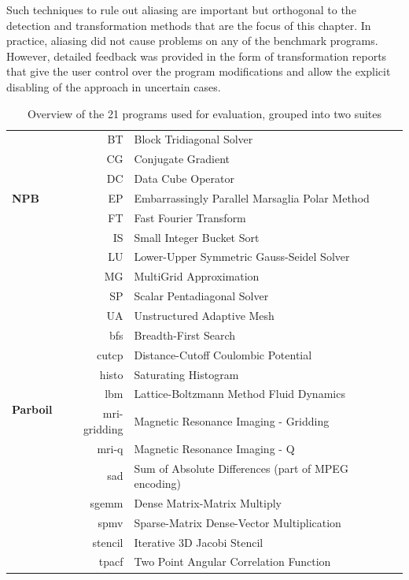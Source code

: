     Such techniques to rule out aliasing are important but orthogonal to the
    detection and transformation methods that are the focus of this chapter.
    In practice, aliasing did not cause problems on any of the benchmark
    programs.
    However, detailed feedback was provided in the form of transformation
    reports that give the user control over the program modifications and allow
    the explicit disabling of the approach in uncertain cases.

\begin{table}[H]
\centering
\begin{tabular}{|l|r|l|}
\hline
\multirow{7}{*}{\bf NPB}
 & BT & Block Tridiagonal Solver\\[-2.9mm]
 & CG & Conjugate Gradient\\[-2.9mm]
 & DC & Data Cube Operator\\[-2.9mm]
 & EP & Embarrassingly Parallel Marsaglia Polar Method\\[-2.9mm]
 & FT & Fast Fourier Transform\\[-2.9mm]
 & IS & Small Integer Bucket Sort \\[-2.9mm]
 & LU & Lower-Upper Symmetric Gauss-Seidel Solver\\[-2.9mm]
 & MG & MultiGrid Approximation\\[-2.9mm]
 & SP & Scalar Pentadiagonal Solver\\[-2.9mm]
 & UA & Unstructured Adaptive Mesh\\
\hline
\multirow{7}{*}{\bf Parboil}
 & bfs          & Breadth-First Search\\[-2.9mm]
 & cutcp        & Distance-Cutoff Coulombic Potential\\[-2.9mm]
 & histo        & Saturating Histogram\\[-2.9mm]
 & lbm          & Lattice-Boltzmann Method Fluid Dynamics\\[-2.9mm]
 & mri-gridding & Magnetic Resonance Imaging - Gridding\\[-2.9mm]
 & mri-q        & Magnetic Resonance Imaging - Q\\[-2.9mm]
 & sad          & Sum of Absolute Differences (part of MPEG encoding)\\[-2.9mm]
 & sgemm        & Dense Matrix-Matrix Multiply\\[-2.9mm]
 & spmv         & Sparse-Matrix Dense-Vector Multiplication\\[-2.9mm]
 & stencil      & Iterative 3D Jacobi Stencil\\[-2.9mm]
 & tpacf        & Two Point Angular Correlation Function\\
\hline
\end{tabular}
\caption{Overview of the 21 programs used for evaluation, grouped into two
         suites}
\end{table}

